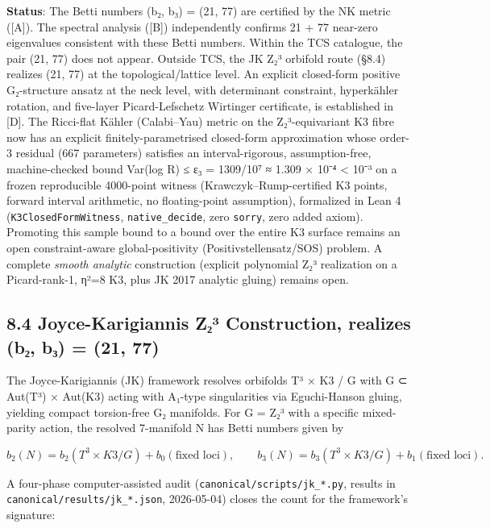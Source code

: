 \documentclass[11pt,a4paper]{article}
\begin{document}
\textbf{Status}: The Betti numbers (b₂, b₃) = (21, 77) are certified by the NK metric ({[}A{]}). The spectral analysis ({[}B{]}) independently confirms 21 + 77 near-zero eigenvalues consistent with these Betti numbers. Within the TCS catalogue, the pair (21, 77) does not appear. Outside TCS, the JK Z₂³ orbifold route (§8.4) realizes (21, 77) at the topological/lattice level. An explicit closed-form positive G₂-structure ansatz at the neck level, with determinant constraint, hyperkähler rotation, and five-layer Picard-Lefschetz Wirtinger certificate, is established in {[}D{]}. The Ricci-flat Kähler (Calabi--Yau) metric on the Z₂³-equivariant K3 fibre now has an explicit finitely-parametrised closed-form approximation whose order-3 residual (667 parameters) satisfies an interval-rigorous, assumption-free, machine-checked bound Var(log R) ≤ ε₃ = 1309/10⁷ ≈ 1.309 × 10⁻⁴ \textless{} 10⁻³ on a frozen reproducible 4000-point witness (Krawczyk--Rump-certified K3 points, forward interval arithmetic, no floating-point assumption), formalized in Lean 4 (\texttt{K3Closed\allowbreak{}Form\allowbreak{}Witness}, \texttt{native\_\allowbreak{}decide}, zero \texttt{sorry}, zero added axiom). Promoting this sample bound to a bound over the entire K3 surface remains an open constraint-aware global-positivity (Positivstellensatz/SOS) problem. A complete \emph{smooth analytic} construction (explicit polynomial Z₂³ realization on a Picard-rank-1, η²=8 K3, plus JK 2017 analytic gluing) remains open.

\subsection{8.4 Joyce-Karigiannis Z₂³ Construction, realizes (b₂, b₃) = (21, 77)}\label{joyce-karigiannis-zux2082uxb3-construction-realizes-bux2082-bux2083-21-77}

The Joyce-Karigiannis (JK) framework \cite{43} resolves orbifolds T³ × K3 / G with G ⊂ Aut(T³) × Aut(K3) acting with A₁-type singularities via Eguchi-Hanson gluing, yielding compact torsion-free G₂ manifolds. For G = Z₂³ with a specific mixed-parity action, the resolved 7-manifold N has Betti numbers given by

\[b_2(N) = b_2(T^3 \times K3 / G) + b_0(\text{fixed loci}), \qquad b_3(N) = b_3(T^3 \times K3 / G) + b_1(\text{fixed loci}).\]

A four-phase computer-assisted audit (\texttt{canonical/\allowbreak{}scripts/\allowbreak{}jk\_\allowbreak{}*.\allowbreak{}py}, results in \texttt{canonical/\allowbreak{}results/\allowbreak{}jk\_\allowbreak{}*.\allowbreak{}json}, 2026-05-04) closes the count for the framework's signature:
\end{document}
